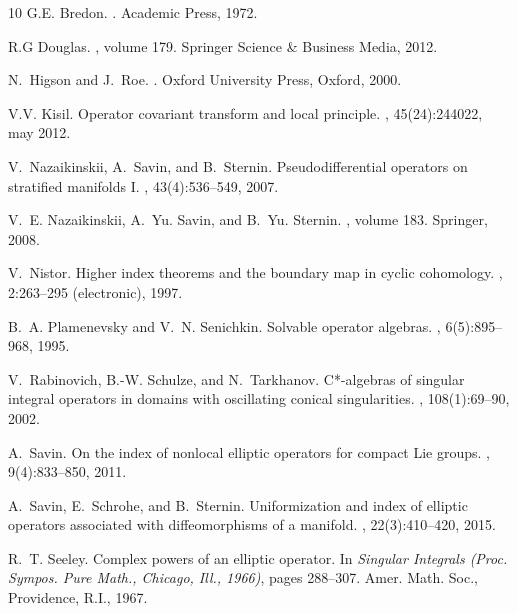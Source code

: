 \documentclass[11pt,a4paper]{amsart}
\newcommand\<{\langle}
\renewcommand\>{\rangle}
\theoremstyle{definition}
\begin{document}
\begin{thebibliography}{10}
G.E. Bredon.
.
\newblock Academic {P}ress, 1972.

R.G Douglas.
, volume 179.
\newblock Springer Science \& Business Media, 2012.

N.~Higson and J.~Roe.
.
\newblock Oxford University Press, Oxford, 2000.

V.V. Kisil.
\newblock Operator covariant transform and local principle.
,
  45(24):244022, may 2012.

V.~Nazaikinskii, A.~Savin, and B.~Sternin.
\newblock Pseudodifferential operators on stratified manifolds {I}.
, 43(4):536--549, 2007.

V.~E. Nazaikinskii, A.~Yu. Savin, and B.~Yu. Sternin.
, volume 183.
\newblock Springer, 2008.

V.~Nistor.
\newblock Higher index theorems and the boundary map in cyclic cohomology.
, 2:263--295 (electronic), 1997.

B.~A. Plamenevsky and V.~N. Senichkin.
\newblock Solvable operator algebras.
, 6(5):895--968, 1995.

V.~Rabinovich, B.-W. Schulze, and N.~Tarkhanov.
\newblock C*-algebras of singular integral operators in domains with
  oscillating conical singularities.
, 108(1):69--90, 2002.

A.~Savin.
\newblock On the index of nonlocal elliptic operators for compact {L}ie groups.
, 9(4):833--850, 2011.

A.~Savin, E.~Schrohe, and B.~Sternin.
\newblock Uniformization and index of elliptic operators associated with
  diffeomorphisms of a manifold.
, 22(3):410--420, 2015.

R.~T. Seeley.
\newblock Complex powers of an elliptic operator.
\newblock In {\em Singular {I}ntegrals ({P}roc. {S}ympos. {P}ure {M}ath.,
  {C}hicago, {I}ll., 1966)}, pages 288--307. Amer. Math. Soc., Providence,
  R.I., 1967.


\end{thebibliography}
\end{document}
